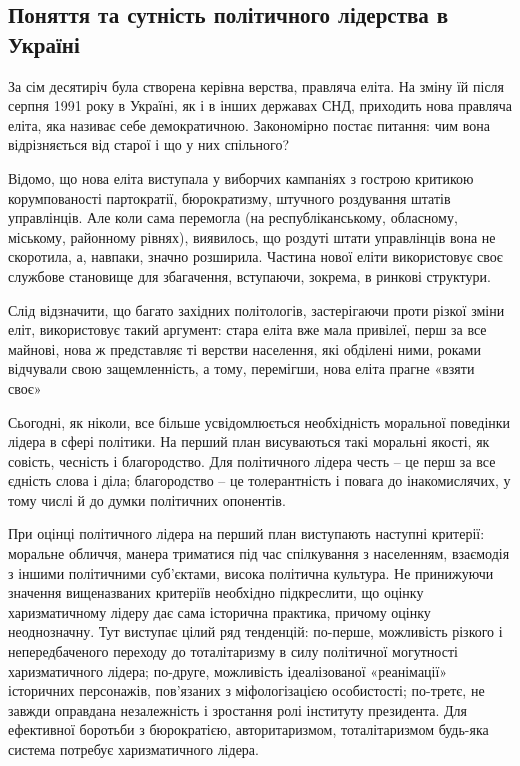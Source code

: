\subsection{Поняття та сутність політичного лідерства в Україні}
За сім десятиріч була створена керівна верства, правляча еліта. На зміну їй після серпня 1991 року в Україні, як і в інших державах СНД, приходить нова правляча еліта, яка називає себе демократичною. Закономірно постає питання: чим вона відрізняється від старої і що у них спільного?

Відомо, що нова еліта виступала у виборчих кампаніях з гострою критикою корумпованості партократії, бюрократизму, штучного роздування штатів управлінців. Але коли сама перемогла (на республіканському, обласному, міському, районному рівнях), виявилось, що роздуті штати управлінців вона не скоротила, а, навпаки, значно розширила. Частина нової еліти використовує своє службове становище для збагачення, вступаючи, зокрема, в ринкові структури.

Слід відзначити, що багато західних політологів, застерігаючи проти різкої зміни еліт, використовує такий аргумент: стара еліта вже мала привілеї, перш за все майнові, нова ж представляє ті верстви населення, які обділені ними, роками відчували свою защемленність, а тому, перемігши, нова еліта прагне «взяти своє»

Сьогодні, як ніколи, все більше усвідомлюється необхідність моральної поведінки лідера в сфері політики. На перший план висуваються такі моральні якості, як совість, чесність і благородство. Для політичного лідера честь – це перш за все єдність слова і діла; благородство – це толерантність і повага до інакомислячих, у тому числі й до думки політичних опонентів.

При оцінці політичного лідера на перший план виступають наступні критерії: моральне обличчя, манера триматися під час спілкування з населенням, взаємодія з іншими політичними суб’єктами, висока політична культура. Не принижуючи значення вищеназваних критеріїв необхідно підкреслити, що оцінку харизматичному лідеру дає сама історична практика, причому оцінку неоднозначну. Тут виступає цілий ряд тенденцій: по-перше, можливість різкого і непередбаченого переходу до тоталітаризму в силу політичної могутності харизматичного лідера; по-друге, можливість ідеалізованої «реанімації» історичних персонажів, пов’язаних з міфологізацією особистості; по-третє, не завжди оправдана незалежність і зростання ролі інституту президента. Для ефективної боротьби з бюрократією, авторитаризмом, тоталітаризмом будь-яка система потребує харизматичного лідера.

